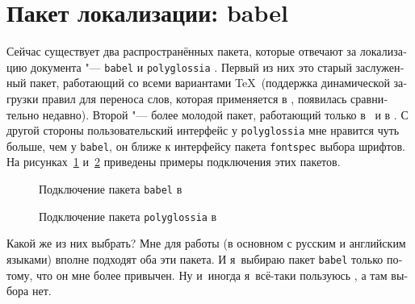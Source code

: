 \documentclass[a4paper,12pt,hyphens]{article}
\newcommand\package[1]{\texttt{#1}}
\begin{document}
\section{Пакет локализации: babel}
Сейчас существует два распространённых пакета, которые отвечают за
локализацию документа "---
\package{babel} \parencite{ctan-babel} и
\package{polyglossia} \parencite{ctan-polyglossia}.
Первый из них это старый заслуженный пакет, работающий со всеми
вариантами \TeX\ (поддержка динамической загрузки правил для
переноса слов, которая применяется в \LuaTeX, появилась сравнительно
недавно). Второй "--- более молодой пакет, работающий только в \XeLaTeX\ и в \LuaLaTeX.
С другой стороны
пользовательский интерфейс у \package{polyglossia} мне нравится чуть больше,
чем у \package{babel}, он ближе к интерфейсу пакета \package{fontspec}
выбора шрифтов. На рисунках~\ref{babel2} и~\ref{polygl1}
приведены примеры подключения этих пакетов.
\begin{figure}[tp]
\begin{latexcode}
\usepackage[english,russian]{babel}
\end{latexcode}
\caption{Подключение пакета \package{babel} в \LuaLaTeX}\label{babel2}
\end{figure}
\begin{figure}[tp]
\begin{latexcode}
\usepackage{polyglossia}
\setmainlanguage{russian}
\end{latexcode}
\caption{Подключение пакета \package{polyglossia} в \LuaLaTeX}\label{polygl1}
\end{figure}

Какой же из них выбрать? Мне для работы (в основном с русским и английским языками)
вполне подходят оба эти пакета. И я~выбираю пакет \package{babel} только потому, что
он мне более привычен. Ну и~иногда я~всё-таки пользуюсь \pdfLaTeX, а там
выбора нет.
\end{document}

